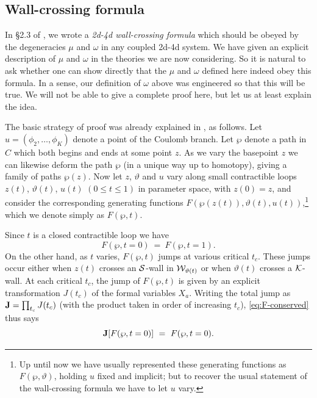 \documentclass[11pt,a4paper]{article}
\def\wnet {{\cal W}}
\def\cS {{\cal S}}
\def\cK{{\cal K}}
\newcommand{\ti}[1]{\textit{#1}}
\def\wnet {{\cal W}}
\begin{document}
\subsection{Wall-crossing formula}\label{subsec:2d4d-wcf}

In \S2.3 of \cite{Gaiotto:2011tf}, we wrote a \ti{2d-4d wall-crossing formula}
which should be obeyed by the degeneracies $\mu$ and $\omega$ in any coupled 2d-4d system.
We have given an explicit description of $\mu$ and $\omega$ in the theories we are now considering.
So it is natural to ask whether one can show directly that the $\mu$ and $\omega$ defined here indeed obey this formula.
In a sense, our definition of $\omega$ above was engineered so that this will be true.
We will not be able to give a complete proof here, but let us at least explain the idea.

The basic strategy of proof was already explained in \cite{Gaiotto:2011tf},
as follows.  Let $u = (\phi_2, \dots, \phi_K)$ denote a point of the Coulomb branch.
Let $\wp$ denote a path in $C$ which both begins and ends at
some point $z$.  As we vary the basepoint $z$ we can likewise
deform the path $\wp$ (in a unique way up to homotopy), giving a family of paths $\wp(z)$.
Now let $z$, $\vartheta$ and $u$ vary along small contractible loops $z(t)$, $\vartheta(t)$, $u(t)$
$(0 \le t \le 1)$ in parameter space, with $z(0) = z$,
and consider the corresponding generating functions
$F(\wp(z(t)), \vartheta(t), u(t))$,\footnote{Up until now we have usually represented
these generating functions as $F(\wp, \vartheta)$, holding $u$ fixed and implicit;
but to recover the usual statement of the wall-crossing
formula we have to let $u$ vary.} which we denote simply as $F(\wp, t)$.

Since $t$ is a closed contractible loop we have
\begin{equation} \label{eq:F-conserved}
 F(\wp, t=0)\ =\ F(\wp, t=1).
\end{equation}
On the other hand, as $t$ varies, $F(\wp, t)$ jumps at various critical $t_c$.
These jumps occur either when $z(t)$ crosses an $\cS$-wall in $\wnet_{\vartheta(t)}$
or when $\vartheta(t)$ crosses a $\cK$-wall.  At each critical $t_c$,
the jump of $F(\wp, t)$ is given by an explicit transformation $J(t_c)$ of the formal variables $X_a$.
Writing the total jump as ${\bf J} = \prod_{t_c} J(t_c)$ (with the product taken in order of increasing $t_c$),
\eqref{eq:F-conserved} thus says
\begin{equation} \label{eq:j-f}
 {\bf J}[ F(\wp, t=0) ]\ =\ F(\wp, t=0).
\end{equation}
\end{document}
